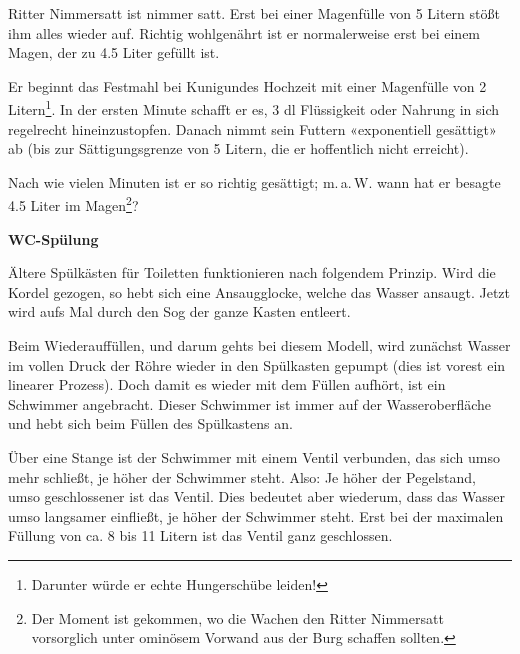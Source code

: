 \nextBbwAufgabenNummer{}

Ritter Nimmersatt ist nimmer satt. Erst bei einer Magenfülle von
5 Litern stößt ihm alles wieder auf. Richtig wohlgenährt ist er
normalerweise erst bei einem Magen, der zu 4.5 Liter gefüllt ist.

Er beginnt das Festmahl bei Kunigundes Hochzeit mit einer Magenfülle
von 2 Litern\footnote{Darunter würde er echte Hungerschübe
  leiden!}. In der ersten Minute schafft er es, 3 dl Flüssigkeit oder Nahrung
in sich regelrecht hineinzustopfen. Danach nimmt sein Futtern
«exponentiell gesättigt» ab (bis zur Sättigungsgrenze von 5 Litern, die er
hoffentlich nicht erreicht).

Nach wie vielen Minuten ist er so richtig gesättigt; m.\,a.\,W. wann
hat er besagte 4.5 Liter im Magen\footnote{Der Moment ist gekommen, wo
  die Wachen den Ritter Nimmersatt vorsorglich unter ominösem Vorwand aus der Burg schaffen sollten.}?

\newpage



\bbwActAufgabenNr{} \textbf{WC-Spülung}\par
Ältere Spülkästen für Toiletten funktionieren nach folgendem Prinzip.
Wird die Kordel gezogen, so hebt sich eine
Ansaugglocke, welche das Wasser ansaugt. Jetzt wird aufs Mal durch den
Sog der ganze Kasten entleert.

Beim Wiederauffüllen, und darum gehts bei diesem Modell, wird zunächst
Wasser im vollen Druck der Röhre wieder in den Spülkasten
gepumpt (dies ist vorest ein linearer Prozess). Doch damit es wieder mit dem Füllen aufhört,
ist ein Schwimmer angebracht. Dieser Schwimmer ist immer auf der
Wasseroberfläche und hebt sich beim Füllen des Spülkastens an.

Über eine Stange ist der Schwimmer
mit einem Ventil verbunden, das sich umso mehr schließt, je höher der
Schwimmer steht. Also: Je höher der Pegelstand, umso geschlossener ist
das Ventil. Dies bedeutet aber wiederum, dass das Wasser umso
langsamer einfließt, je höher der Schwimmer steht. Erst bei der
maximalen Füllung von ca. 8 bis 11 Litern ist das Ventil ganz
geschlossen. 

